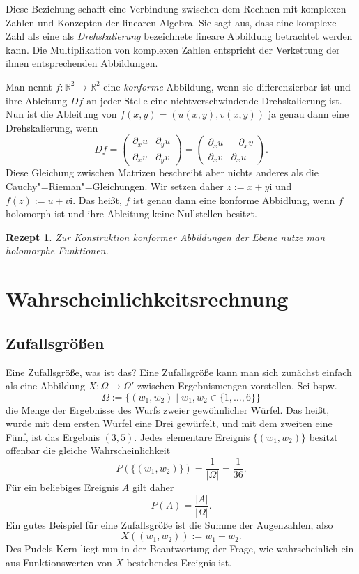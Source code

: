 \documentclass[a4paper,10pt,fleqn,twocolumn,twoside,dvipdfmx]{scrartcl}
\theoremstyle{rmbox}
\newtheorem{Rezept}{Rezept}[section]
\newcommand{\ui}{\mathrm{i}}
\newcommand{\R}{\mathbb R}
\begin{document}
Diese Beziehung schafft eine Verbindung zwischen dem
Rechnen mit komplexen Zahlen und Konzepten der linearen Algebra.
Sie sagt aus, dass eine komplexe Zahl als eine als \emph{Drehskalierung}
bezeichnete lineare Abbildung betrachtet werden kann. Die Multiplikation
von komplexen Zahlen entspricht der Verkettung der ihnen entsprechenden
Abbildungen.

Man nennt $f\colon\R^2\to\R^2$ eine \emph{konforme} Abbildung, wenn sie
differenzierbar ist und ihre Ableitung $Df$ an jeder Stelle
eine nichtverschwindende Drehskalierung ist. Nun ist die
Ableitung von $f(x,y)=(u(x,y),v(x,y))$ ja genau dann eine
Drehskalierung, wenn
\[Df = \begin{pmatrix}
\partial_x u & \partial_y u\\
\partial_x v & \partial_y v
\end{pmatrix} = \begin{pmatrix}
\partial_x u & -\partial_x v\\
\partial_x v & \partial_x u
\end{pmatrix}.\]
Diese Gleichung zwischen Matrizen beschreibt aber nichts anderes als
die Cauchy"=Rieman"=Gleichungen. Wir setzen daher $z:=x+y\ui$ und
$f(z):=u+v\ui$. Das heißt, $f$ ist genau dann eine konforme
Abbidlung, wenn $f$ holomorph ist und ihre Ableitung keine
Nullstellen besitzt.

\begin{Rezept}
Zur Konstruktion konformer Abbildungen der Ebene
nutze man holomorphe Funktionen.
\end{Rezept}

\section{Wahrscheinlichkeitsrechnung}

\subsection{Zufallsgrößen}

Eine Zufallsgröße, was ist das? Eine Zufallsgröße kann man sich
zunächst einfach als eine Abbildung $X\colon\Omega\to\Omega'$ zwischen
Ergebnismengen vorstellen. Sei bspw.
\[\Omega := \{(w_1,w_2)\mid w_1,w_2\in\{1,\ldots,6\}\}\]
die Menge der Ergebnisse des Wurfs zweier gewöhnlicher
Würfel. Das heißt, wurde mit dem ersten Würfel eine Drei
gewürfelt, und mit dem zweiten eine Fünf, ist das Ergebnis $(3, 5)$.
Jedes elementare Ereignis $\{(w_1,w_2)\}$ besitzt offenbar
die gleiche Wahrscheinlichkeit%
\[P(\{(w_1,w_2)\}) = \frac{1}{|\Omega|} = \frac{1}{36}.\]
Für ein beliebiges Ereignis $A$ gilt daher%
\[P(A) = \frac{|A|}{|\Omega|}.\]
Ein gutes Beispiel für eine Zufallsgröße ist die Summe der
Augenzahlen, also%
\[X((w_1,w_2)) := w_1 + w_2.\]
Des Pudels Kern liegt nun in der Beantwortung der Frage, wie
wahrscheinlich ein aus Funktionswerten von $X$ bestehendes
Ereignis ist.
\end{document}
